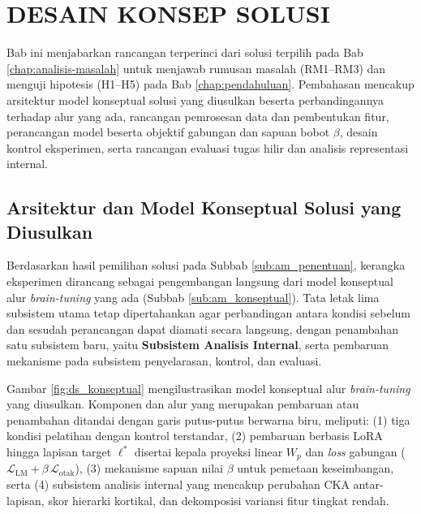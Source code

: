 \chapter{DESAIN KONSEP SOLUSI}
\label{chap:desain-konsep-solusi}

Bab ini menjabarkan rancangan terperinci dari solusi terpilih pada Bab \ref{chap:analisis-masalah} untuk menjawab rumusan masalah (RM1--RM3) dan menguji hipotesis (H1--H5) pada Bab \ref{chap:pendahuluan}. Pembahasan mencakup arsitektur model konseptual solusi yang diusulkan beserta perbandingannya terhadap alur yang ada, rancangan pemrosesan data dan pembentukan fitur, perancangan model beserta objektif gabungan dan sapuan bobot $\beta$, desain kontrol eksperimen, serta rancangan evaluasi tugas hilir dan analisis representasi internal.

\section{Arsitektur dan Model Konseptual Solusi yang Diusulkan}
\label{sec:ds_arsitektur}

Berdasarkan hasil pemilihan solusi pada Subbab \ref{sub:am_penentuan}, kerangka eksperimen dirancang sebagai pengembangan langsung dari model konseptual alur \textit{brain-tuning} yang ada (Subbab \ref{sub:am_konseptual}). Tata letak lima subsistem utama tetap dipertahankan agar perbandingan antara kondisi sebelum dan sesudah perancangan dapat diamati secara langsung, dengan penambahan satu subsistem baru, yaitu \textbf{Subsistem Analisis Internal}, serta pembaruan mekanisme pada subsistem penyelarasan, kontrol, dan evaluasi.

Gambar \ref{fig:ds_konseptual} mengilustrasikan model konseptual alur \textit{brain-tuning} yang diusulkan. Komponen dan alur yang merupakan pembaruan atau penambahan ditandai dengan garis putus-putus berwarna biru, meliputi: (1) tiga kondisi pelatihan dengan kontrol terstandar, (2) pembaruan berbasis LoRA hingga lapisan target $\ell^*$ disertai kepala proyeksi linear $W_p$ dan \textit{loss} gabungan ($\mathcal{L}_{\text{LM}} + \beta\,\mathcal{L}_{\text{otak}}$), (3) mekanisme sapuan nilai $\beta$ untuk pemetaan keseimbangan, serta (4) subsistem analisis internal yang mencakup perubahan CKA antar-lapisan, skor hierarki kortikal, dan dekomposisi variansi fitur tingkat rendah.

